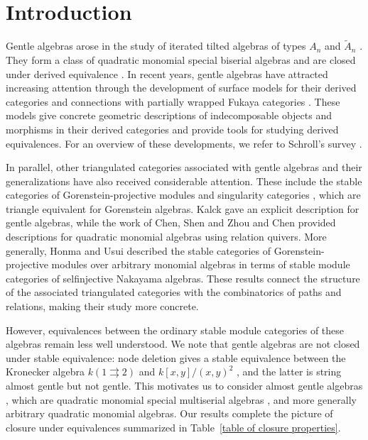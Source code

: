 \documentclass[11pt]{article}
\theoremstyle{definition}
\begin{document}
\tableofcontents

\section{Introduction}

	Gentle algebras arose in the study of iterated tilted algebras of types $A_n$ and $\widetilde{A}_n$ \cite{AH81,AS87}. They form a class of quadratic monomial special biserial algebras \cite{SW83,WW85,Sch15} and are closed under derived equivalence \cite{SZ03}. In recent years, gentle algebras have attracted increasing attention through the development of surface models for their derived categories \cite{OPS} and connections with partially wrapped Fukaya categories \cite{HKK17,LP20}. These models give concrete geometric descriptions of indecomposable objects and morphisms in their derived categories and provide tools for studying derived equivalences. For an overview of these developments, we refer to Schroll's survey \cite{Sch26}.

	In parallel, other triangulated categories associated with gentle algebras and their generalizations have also received considerable attention. These include the stable categories of Gorenstein-projective modules \cite{Buc87,Hap91} and singularity categories \cite{Buc87,Orl04}, which are triangle equivalent for Gorenstein algebras. Kalck \cite{Kal15} gave an explicit description for gentle algebras, while the work of Chen, Shen and Zhou \cite{CSZ18} and Chen \cite{Che18} provided descriptions for quadratic monomial algebras using relation quivers. More generally, Honma and Usui \cite{HU25} described the stable categories of Gorenstein-projective modules over arbitrary monomial algebras in terms of stable module categories of selfinjective Nakayama algebras. These results connect the structure of the associated triangulated categories with the combinatorics of paths and relations, making their study more concrete.

	However, equivalences between the ordinary stable module categories of these algebras remain less well understood. We note that gentle algebras are not closed under stable equivalence: node deletion gives a stable equivalence between the Kronecker algebra $k(1\rightrightarrows 2)$ and $k[x,y]/(x,y)^2$ \cite{Mar80}, and the latter is string almost gentle \cite{GS19,FGR22} but not gentle. This motivates us to consider almost gentle algebras \cite{GS19}, which are quadratic monomial special multiserial algebras \cite{HW84,GS16MS}, and more generally arbitrary quadratic monomial algebras. Our results complete the picture of closure under equivalences summarized in Table~\ref{table of closure properties}.
\end{document}

